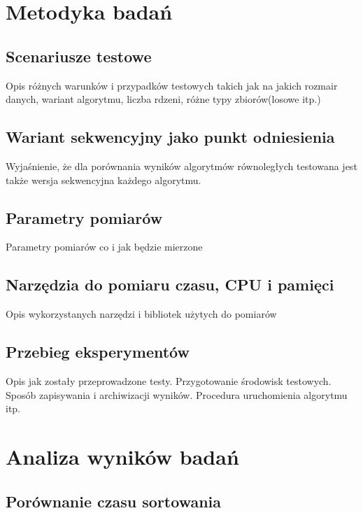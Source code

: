\documentclass{PracaDyplomowa-Szablon}
\begin{document}
\chapter{Metodyka badań}
\label{cha:MetodykaBadan}

\section{Scenariusze testowe}
\label{sec:Scenariusze}

Opis różnych warunków i przypadków testowych takich jak na jakich rozmair danych, wariant algorytmu, liczba rdzeni, różne typy zbiorów(losowe itp.)

\section{Wariant sekwencyjny jako punkt odniesienia}
\label{sec:WariantSekwencyjny}

Wyjaśnienie, że dla porównania wyników algorytmów równoległych testowana jest także wersja sekwencyjna każdego algorytmu. 

\section{Parametry pomiarów}
\label{sec:ParametryPomiarow}

Parametry pomiarów co i jak będzie mierzone

\section{Narzędzia do pomiaru czasu, CPU i pamięci}
\label{sec:NarzedziaPomiarowe}

Opis wykorzystanych narzędzi i bibliotek użytych do pomiarów

\section{Przebieg eksperymentów}
\label{sec:PrzebiegBadan}

Opis jak zostały przeprowadzone testy. Przygotowanie środowisk testowych. Sposób zapisywania i archiwizacji wyników. Procedura uruchomienia algorytmu itp.


\chapter{Analiza wyników badań}
\label{cha:AnalizaBadan}

\section{Porównanie czasu sortowania}
\label{sec:CzasSortowania}
\end{document}
